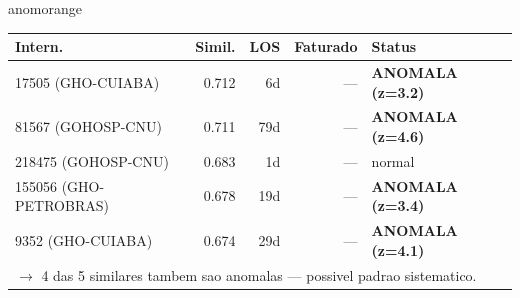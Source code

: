 \documentclass[a4paper,10pt]{article}
\begin{document}
\begin{anomalycard}[Internacao 164488 | GHO-PETROBRAS | ALTO (z=3.91)]{anomorange}
\begin{tabular}{l r r r l}\toprule\textbf{Intern.} & \textbf{Simil.} & \textbf{LOS} & \textbf{Faturado} & \textbf{Status} \\\midrule
17505 (GHO-CUIABA) & 0.712 & 6d & --- & \textcolor{anomred}{\textbf{ANOMALA (z=3.2)}} \\
81567 (GOHOSP-CNU) & 0.711 & 79d & --- & \textcolor{anomred}{\textbf{ANOMALA (z=4.6)}} \\
218475 (GOHOSP-CNU) & 0.683 & 1d & --- & \textcolor{jcubeblue}{normal} \\
155056 (GHO-PETROBRAS) & 0.678 & 19d & --- & \textcolor{anomred}{\textbf{ANOMALA (z=3.4)}} \\
9352 (GHO-CUIABA) & 0.674 & 29d & --- & \textcolor{anomred}{\textbf{ANOMALA (z=4.1)}} \\
\multicolumn{5}{l}{\textcolor{anomred}{\small $\rightarrow$ 4 das 5 similares tambem sao anomalas --- possivel padrao sistematico.}} \\
\bottomrule\end{tabular}


\end{anomalycard}

\newpage
\end{document}
